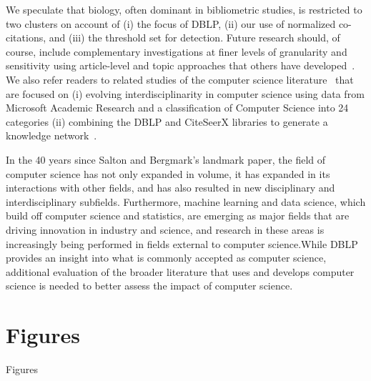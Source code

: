 We speculate that biology, often dominant in bibliometric studies, is restricted to two clusters on account of (i) the focus of DBLP,  (ii) our use of normalized co-citations, and (iii) the threshold set for detection. Future research should, of course, include complementary investigations at finer levels of granularity and sensitivity using article-level and topic approaches that others have developed~\cite{glanzel_using_2017,boyack_clustering_2011,boyack_investigating_2017,boyack_classification_2014,sjogarde_granularity_2019,traag_louvain_2019}. We also refer readers to related studies of the computer science literature~\cite{chakraborty_role_2018} that are focused on (i) evolving interdisciplinarity in computer science using data from Microsoft Academic Research and a classification of Computer Science into 24 categories (ii) combining the DBLP and CiteSeerX libraries to generate a knowledge network~\cite{pham_2010}.

In the 40 years since Salton and Bergmark's landmark paper, the field of computer science has not only expanded in volume, it has expanded in its interactions with other fields, and has also resulted in new disciplinary and interdisciplinary subfields. Furthermore, machine learning and data science, which build off computer science and statistics, are emerging as major fields that are driving innovation in industry and science, and research in these areas is increasingly being performed in fields external to computer science.While DBLP provides an insight into what is commonly accepted as computer science, additional evaluation of the broader literature that uses and develops computer science is needed to better assess the impact of computer science.

\clearpage

\section{Figures}
{Figures}

